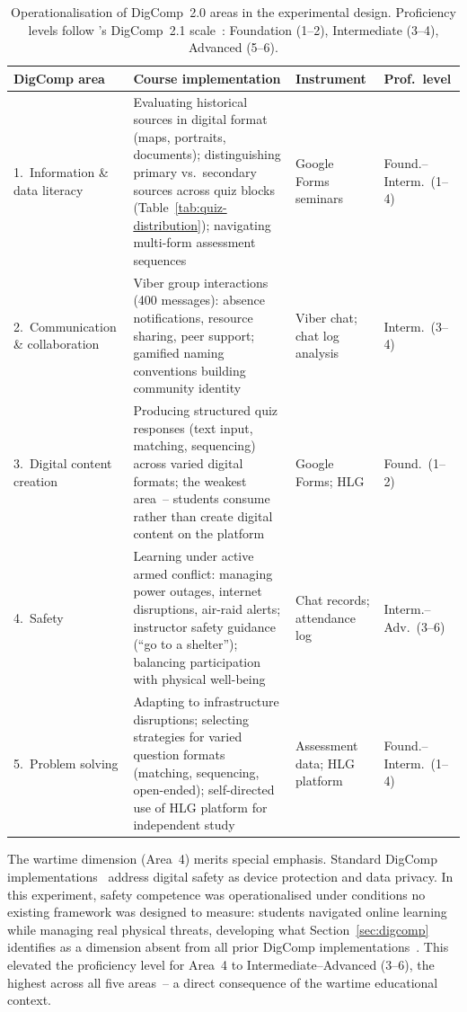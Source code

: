 \begin{table}[!h]
\centering
\caption{Operationalisation of DigComp~2.0 areas in the experimental design. Proficiency levels follow \citeauthor{Carretero2017}'s DigComp~2.1 scale~\cite{Carretero2017}: Foundation (1--2), Intermediate (3--4), Advanced (5--6).}
\label{tab:digcomp-chapter2}
\small
\begin{tabular}{@{}p{2.8cm}p{4.5cm}p{2.8cm}p{2cm}@{}}
\toprule
\textbf{DigComp area} & \textbf{Course implementation} & \textbf{Instrument} & \textbf{Prof.\ level} \\
\midrule
1.\ Information \& data literacy & Evaluating historical sources in digital format (maps, portraits, documents); distinguishing primary vs.\ secondary sources across quiz blocks (Table~\ref{tab:quiz-distribution}); navigating multi-form assessment sequences & Google Forms seminars & Found.--Interm.\ (1--4) \\
\midrule
2.\ Communication \& collaboration & Viber group interactions (400 messages): absence notifications, resource sharing, peer support; gamified naming conventions building community identity & Viber chat; chat log analysis & Interm.\ (3--4) \\
\midrule
3.\ Digital content creation & Producing structured quiz responses (text input, matching, sequencing) across varied digital formats; the weakest area~-- students consume rather than create digital content on the platform & Google Forms; HLG & Found.\ (1--2) \\
\midrule
4.\ Safety & Learning under active armed conflict: managing power outages, internet disruptions, air-raid alerts; instructor safety guidance (``go to a shelter''); balancing participation with physical well-being & Chat records; attendance log & Interm.--Adv.\ (3--6) \\
\midrule
5.\ Problem solving & Adapting to infrastructure disruptions; selecting strategies for varied question formats (matching, sequencing, open-ended); self-directed use of HLG platform for independent study & Assessment data; HLG platform & Found.--Interm.\ (1--4) \\
\bottomrule
\end{tabular}
\end{table}

\noindent The wartime dimension (Area~4) merits special emphasis. Standard DigComp implementations~\cite{Vuorikari2016, Cosgrove2025} address digital safety as device protection and data privacy. In this experiment, safety competence was operationalised under conditions no existing framework was designed to measure: students navigated online learning while managing real physical threats, developing what Section~\ref{sec:digcomp} identifies as a dimension absent from all prior DigComp implementations~\cite{UNESCO2023, Ovcharuk2023}. This elevated the proficiency level for Area~4 to Intermediate--Advanced (3--6), the highest across all five areas~-- a direct consequence of the wartime educational context.

